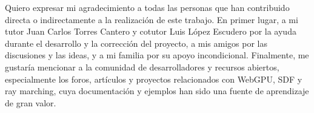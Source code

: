        \vspace{1cm}


Quiero expresar mi agradecimiento a todas las personas que han contribuido directa o indirectamente a la realización de este trabajo.
En primer lugar, a mi tutor Juan Carlos Torres Cantero y cotutor Luis
López Escudero por la ayuda durante el desarrollo y la corrección del proyecto, a mis amigos por las discusiones y las ideas, y a mi familia por su apoyo incondicional.
\bigbreak
Finalmente, me gustaría mencionar a la comunidad de desarrolladores y
recursos abiertos, especialmente los foros, artículos y proyectos relacionados
con WebGPU, SDF y ray marching, cuya documentación y ejemplos han
sido una fuente de aprendizaje de gran valor.